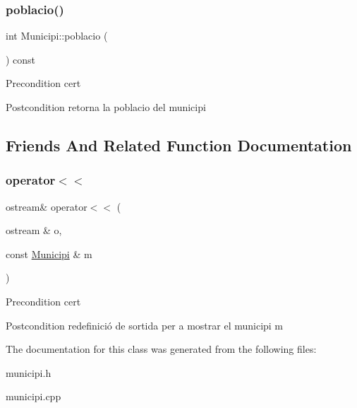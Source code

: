 \subsubsection{\texorpdfstring{poblacio()}{poblacio()}}
{\footnotesize\ttfamily int Municipi\+::poblacio (\begin{DoxyParamCaption}{ }\end{DoxyParamCaption}) const}

\begin{DoxyPrecond}{Precondition}
cert 
\end{DoxyPrecond}
\begin{DoxyPostcond}{Postcondition}
retorna la poblacio del municipi 
\end{DoxyPostcond}


\subsection{Friends And Related Function Documentation}
\mbox{\label{classMunicipi_a68b2ff825cd32c02ea4e845a460bdb4a}} 
\subsubsection{\texorpdfstring{operator$<$$<$}{operator<<}}
{\footnotesize\ttfamily ostream\& operator$<$$<$ (\begin{DoxyParamCaption}\item[{ostream \&}]{o,  }\item[{const \hyperlink{classMunicipi}{Municipi} \&}]{m }\end{DoxyParamCaption})\hspace{0.3cm}{\ttfamily [friend]}}

\begin{DoxyPrecond}{Precondition}
cert 
\end{DoxyPrecond}
\begin{DoxyPostcond}{Postcondition}
redefinició de sortida per a mostrar el municipi m 
\end{DoxyPostcond}


The documentation for this class was generated from the following files\+:\begin{DoxyCompactItemize}
\item 
municipi.\+h\item 
municipi.\+cpp\end{DoxyCompactItemize}
